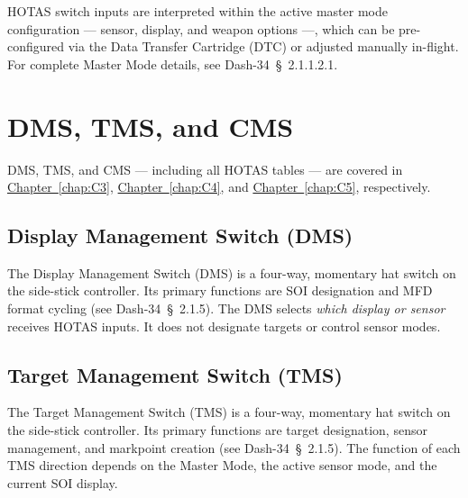 \documentclass[11pt, a4paper, twoside]{report}
\newcommand{\dashref}[1]{Dash-34~\S~#1}
\newcommand{\chapref}[1]{\hyperref[#1]{Chapter~\ref*{#1}}}
\begin{document}
HOTAS switch inputs are interpreted within the active master mode configuration --- sensor, display, and weapon options ---, which can be pre-configured via the Data Transfer Cartridge (DTC) or adjusted manually in-flight. For complete Master Mode details, see \dashref{2.1.1.2.1}.

\section{DMS, TMS, and CMS}
\label{sec:C2-S3}

DMS, TMS, and CMS — including all HOTAS tables — are covered in \chapref{chap:C3}, \chapref{chap:C4}, and \chapref{chap:C5}, respectively.

\subsection{Display Management Switch (DMS)}
\label{sec:C2-S3-S1}

The Display Management Switch (DMS) is a four-way, momentary hat switch on the side-stick controller. Its primary functions are SOI designation and MFD format cycling (see \dashref{2.1.5}). The DMS selects \textit{which display or sensor} receives HOTAS inputs. It does not designate targets or control sensor modes.

\subsection{Target Management Switch (TMS)}
\label{sec:C2-S3-S2}

The Target Management Switch (TMS) is a four-way, momentary hat switch on the side-stick controller. Its primary functions are target designation, sensor management, and markpoint creation (see \dashref{2.1.5}). The function of each TMS direction depends on the Master Mode, the active sensor mode, and the current SOI display.
\end{document}

